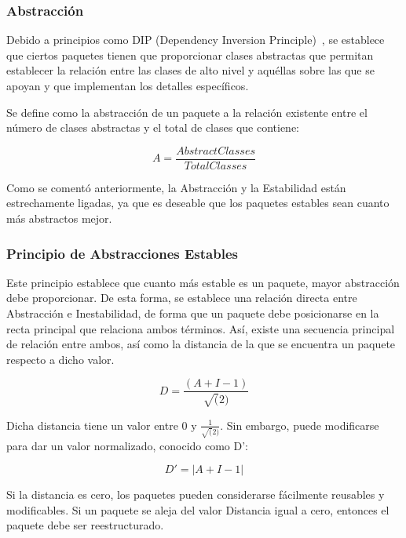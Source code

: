 \documentclass[11pt]{article}
\begin{document}
\subsubsection{Abstracción}
Debido a principios como DIP (Dependency Inversion Principle)~\cite{unclebob:stabilityandabstraction}, se establece que ciertos paquetes tienen que proporcionar clases abstractas que permitan establecer la relación entre las clases de alto nivel y aquéllas sobre las que se apoyan y que implementan los detalles específicos.

Se define como la abstracción de un paquete a la relación existente entre el número de clases abstractas y el total de clases que contiene:

\begin{equation}
A = \frac{Abstract Classes}{Total Classes}
\end{equation}

Como se comentó anteriormente, la Abstracción y la Estabilidad están estrechamente ligadas, ya que es deseable que los paquetes estables sean cuanto más abstractos mejor.

\subsubsection{Principio de Abstracciones Estables}

Este principio establece que cuanto más estable es un paquete, mayor abstracción debe proporcionar. De esta forma, se establece una relación directa entre Abstracción e Inestabilidad, de forma que un paquete debe posicionarse en la recta principal que relaciona ambos términos. Así, existe una secuencia principal de relación entre ambos, así como la distancia de la que se encuentra un paquete respecto a dicho valor. 

\begin{equation}
D = \frac{(A+I-1)}{\sqrt(2)}
\end{equation}

Dicha distancia tiene un valor entre 0 y $\frac{1}{\sqrt(2)}$. Sin embargo, puede modificarse para dar un valor normalizado, conocido como D':

\begin{equation}
D' = |A+I-1|
\end{equation}

Si la distancia es cero, los paquetes pueden considerarse fácilmente reusables y modificables. Si un paquete se aleja del valor Distancia igual a cero, entonces el paquete debe ser reestructurado.
\end{document}
